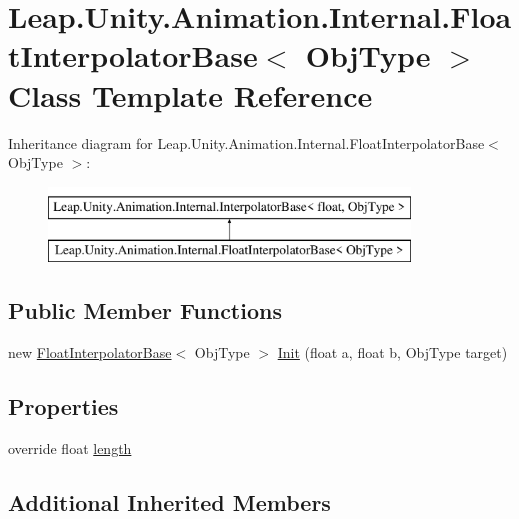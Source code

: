 \hypertarget{class_leap_1_1_unity_1_1_animation_1_1_internal_1_1_float_interpolator_base}{}\section{Leap.\+Unity.\+Animation.\+Internal.\+Float\+Interpolator\+Base$<$ Obj\+Type $>$ Class Template Reference}
\label{class_leap_1_1_unity_1_1_animation_1_1_internal_1_1_float_interpolator_base}
Inheritance diagram for Leap.\+Unity.\+Animation.\+Internal.\+Float\+Interpolator\+Base$<$ Obj\+Type $>$\+:\begin{figure}[H]
\begin{center}
\leavevmode
\includegraphics[height=2.000000cm]{class_leap_1_1_unity_1_1_animation_1_1_internal_1_1_float_interpolator_base}
\end{center}
\end{figure}
\subsection*{Public Member Functions}
\begin{DoxyCompactItemize}
\item 
new \mbox{\hyperlink{class_leap_1_1_unity_1_1_animation_1_1_internal_1_1_float_interpolator_base}{Float\+Interpolator\+Base}}$<$ Obj\+Type $>$ \mbox{\hyperlink{class_leap_1_1_unity_1_1_animation_1_1_internal_1_1_float_interpolator_base_a63bca304ef4a29d14428bf8cd5de1dd2}{Init}} (float a, float b, Obj\+Type target)
\end{DoxyCompactItemize}
\subsection*{Properties}
\begin{DoxyCompactItemize}
\item 
override float \mbox{\hyperlink{class_leap_1_1_unity_1_1_animation_1_1_internal_1_1_float_interpolator_base_a99ad80f78918a14d9ac5e5ccea295446}{length}}
\end{DoxyCompactItemize}
\subsection*{Additional Inherited Members}


